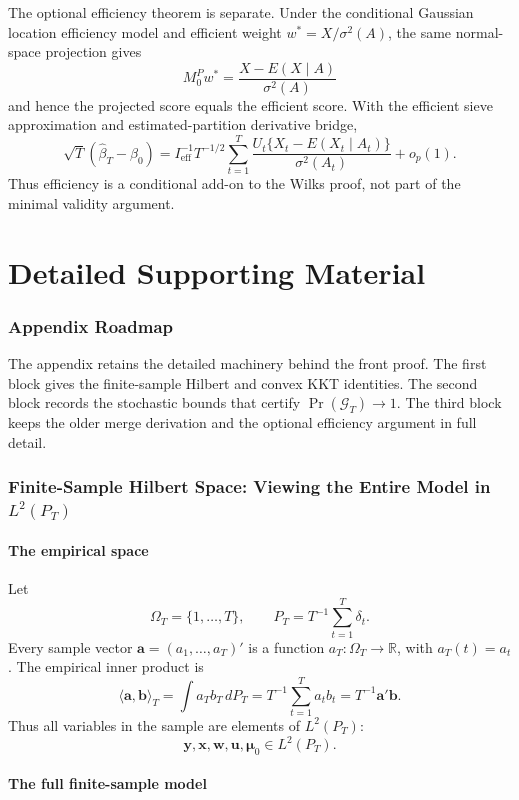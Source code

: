 \documentclass[12pt]{article}
\numberwithin{equation}{section}
\theoremstyle{definition}
\newcommand{\R}{\mathbb R}
\newcommand{\LtwoT}{L^2(P_T)}
\newcommand{\innerT}[2]{\langle #1,#2\rangle_T}
\begin{document}
The optional efficiency theorem is separate. Under the conditional Gaussian
location efficiency model and efficient weight \(w^*=X/\sigma^2(A)\), the same
normal-space projection gives
\[
    M_0^Pw^*=\frac{X-E(X\mid A)}{\sigma^2(A)}
\]
and hence the projected score equals the efficient score. With the efficient
sieve approximation and estimated-partition derivative bridge,
\[
    \sqrt T(\widehat\beta_T-\beta_0)
    =I_{\mathrm{eff}}^{-1}T^{-1/2}\sum_{t=1}^T
      \frac{U_t\{X_t-E(X_t\mid A_t)\}}{\sigma^2(A_t)}+
      o_p(1).
\]
Thus efficiency is a conditional add-on to the Wilks proof, not part of the
minimal validity argument.

\appendix
\part{Detailed Supporting Material}

\section*{Appendix Roadmap}
The appendix retains the detailed machinery behind the front proof. The first block gives the finite-sample Hilbert and convex KKT identities. The second block records the stochastic bounds that certify \(\Pr(\mathcal G_T)\to1\). The third block keeps the older merge derivation and the optional efficiency argument in full detail.
\section{Finite-Sample Hilbert Space: Viewing the Entire Model in \texorpdfstring{\(L^2(P_T)\)}{L2PT}}

\subsection{The empirical space}

Let
\[
    \Omega_T=\{1,\ldots,T\},
    \qquad
    P_T=T^{-1}\sum_{t=1}^T\delta_t.
\]
Every sample vector \(\bm a=(a_1,\ldots,a_T)'\) is a function
\(a_T:\Omega_T\to\R\), with \(a_T(t)=a_t\). The empirical inner product is
\[
    \innerT{\bm a}{\bm b}
    =\int a_T b_T\,dP_T
    =T^{-1}\sum_{t=1}^Ta_tb_t
    =T^{-1}\bm a'\bm b.
\]
Thus all variables in the sample are elements of \(\LtwoT\):
\[
    \bm y,\bm x,\bm w,\bm u,\bm\mu_0\in\LtwoT.
\]

\subsection{The full finite-sample model}
\end{document}
